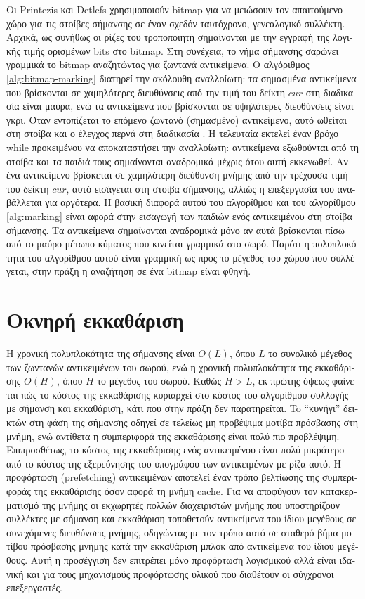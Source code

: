 \begin{greek}
Οι Printezis και Detlefs \cite{DBLP:conf/iwmm/PrintezisD00}
χρησιμοποιούν bitmap για να μειώσουν τον απαιτούμενο χώρο
για τις στοίβες σήμανσης σε έναν σχεδόν-ταυτόχρονο, γενεαλογικό
συλλέκτη. Αρχικά, ως συνήθως οι ρίζες του τροποποιητή σημαίνονται
με την εγγραφή της λογικής τιμής ορισμένων bits στο bitmap.
Στη συνέχεια, το νήμα σήμανσης σαρώνει γραμμικά το bitmap αναζητώντας
για ζωντανά αντικείμενα. Ο αλγόριθμος \ref{alg:bitmap-marking}
διατηρεί την ακόλουθη αναλλοίωτη: τα σημασμένα αντικείμενα
που βρίσκονται σε χαμηλότερες διευθύνσεις από την τιμή του
δείκτη $cur$ στη διαδικασία  είναι μαύρα,
ενώ τα αντικείμενα που βρίσκονται σε υψηλότερες διευθύνσεις
είναι γκρι. Όταν εντοπίζεται το επόμενο ζωντανό (σημασμένο)
αντικείμενο, αυτό ωθείται στη στοίβα και ο έλεγχος περνά
στη διαδικασία . Η τελευταία εκτελεί έναν
βρόχο while προκειμένου να αποκαταστήσει την αναλλοίωτη:
αντικείμενα εξωθούνται από τη στοίβα και τα παιδιά τους
σημαίνονται αναδρομικά μέχρις ότου αυτή εκκενωθεί. Αν ένα
αντικείμενο βρίσκεται σε χαμηλότερη διεύθυνση μνήμης από
την τρέχουσα τιμή του δείκτη $cur$, αυτό εισάγεται στη στοίβα
σήμανσης, αλλιώς η επεξεργασία του αναβάλλεται για αργότερα. 
Η βασική διαφορά αυτού του αλγορίθμου και του αλγορίθμου 
\ref{alg:marking} είναι αφορά στην εισαγωγή των παιδιών ενός 
αντικειμένου στη στοίβα σήμανσης. Τα αντικείμενα σημαίνονται 
αναδρομικά μόνο αν αυτά βρίσκονται πίσω από το μαύρο μέτωπο κύματος 
που κινείται γραμμικά στο σωρό. Παρότι η πολυπλοκότητα του αλγορίθμου 
αυτού είναι γραμμική ως προς το μέγεθος του χώρου που συλλέγεται, 
στην πράξη η αναζήτηση σε ένα bitmap είναι φθηνή.
 
\section{Οκνηρή εκκαθάριση}
Η χρονική πολυπλοκότητα της σήμανσης είναι $O(L)$, όπου $L$ το 
συνολικό μέγεθος των ζωντανών αντικειμένων του σωρού, ενώ η 
χρονική πολυπλοκότητα της εκκαθάρισης $O(H)$, όπου $H$ το μέγεθος 
του σωρού. Καθώς $H>L$, εκ πρώτης όψεως φαίνεται πώς το κόστος 
της εκκαθάρισης κυριαρχεί στο κόστος του αλγορίθμου συλλογής με 
σήμανση και εκκαθάριση, κάτι που στην πράξη δεν παρατηρείται. To 
``κυνήγι'' δεικτών στη φάση της σήμανσης οδηγεί σε τελείως μη 
προβέψιμα μοτίβα πρόσβασης στη μνήμη, ενώ αντίθετα η συμπεριφορά 
της εκκαθάρισης είναι πολύ πιο προβλέψιμη. Επιπροσθέτως, το 
κόστος της εκκαθάρισης ενός αντικειμένου είναι πολύ μικρότερο από 
το κόστος της εξερεύνησης του υπογράφου των αντικειμένων με ρίζα 
αυτό. Η προφόρτωση (prefetching) αντικειμένων αποτελεί έναν τρόπο 
βελτίωσης της συμπεριφοράς της εκκαθάρισης όσον αφορά τη μνήμη 
cache. Για να αποφύγουν τον κατακερματισμό της μνήμης οι εκχωρητές 
πολλών διαχειριστών μνήμης που υποστηρίζουν συλλέκτες με σήμανση 
και εκκαθάριση τοποθετούν αντικείμενα του ίδιου μεγέθους σε 
συνεχόμενες διευθύνσεις μνήμης, οδηγώντας με τον τρόπο αυτό σε
σταθερό βήμα μοτίβου πρόσβασης μνήμης κατά την εκκαθάριση μπλοκ
από αντικείμενα του ίδιου μεγέθους. Αυτή η προσέγγιση δεν 
επιτρέπει μόνο προφόρτωση λογισμικού αλλά είναι ιδανική και για
τους μηχανισμούς προφόρτωσης υλικού που διαθέτουν οι σύγχρονοι
επεξεργαστές.


\end{greek}
